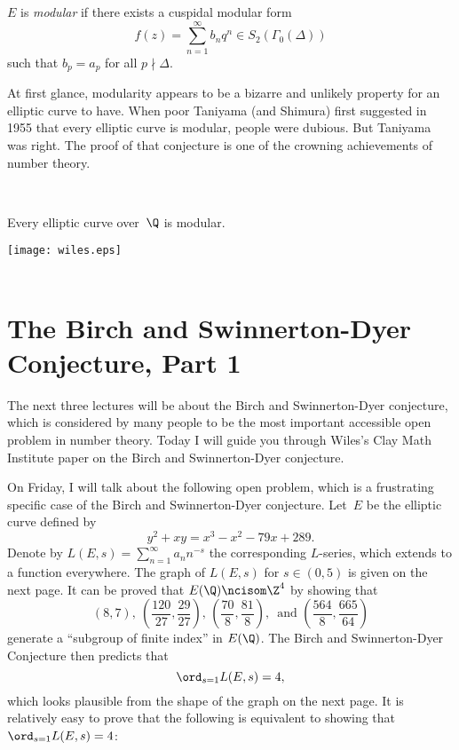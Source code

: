 \documentclass[11pt]{report}
\begin{document}
\begin{definition}[Modular]
  $E$ is {\em modular} if there
  exists a cuspidal modular form
  $$
    f(z) = \sum_{n=1}^{\infty} b_n q^n\in S_2(\Gamma_0(\Delta))
  $$
  such that
  $b_p = a_p$ for all $p\nmid \Delta$.
\end{definition}

At first glance, modularity appears to be a bizarre and unlikely
property for an elliptic curve to have.  When poor Taniyama (and
Shimura) first suggested in 1955 that every elliptic curve is modular,
people were dubious.  But Taniyama was right.  The proof of that conjecture
is one of the crowning achievements of number theory.

\begin{theorem}
  \mbox{}\vspace{-1.5em}\\
  \begin{center}
    {\sc Every elliptic curve over~$\Q$ is modular.}
  \end{center}

\end{theorem}

\vfill

\noindent{}\texttt{[image: wiles.eps]}\\
\mbox{ }\hspace{1.5em}{\small Wiles}








\chapter{The Birch and Swinnerton-Dyer Conjecture, Part 1}



The next three lectures will be about the
Birch and Swinnerton-Dyer conjecture, which is
considered by many people to be the most important
accessible open problem in number theory.  Today I
will guide you through Wiles's Clay Math Institute
paper on the Birch and Swinnerton-Dyer conjecture.

On Friday, I will talk about the following open problem, which is a
frustrating specific case of the Birch and Swinnerton-Dyer conjecture.
Let~$E$ be the elliptic curve defined by
$$
  y^2 + xy = x^3 - x^2 -79x + 289.
$$
Denote by
$L(E,s)=\sum_{n=1}^{\infty} a_n n^{-s}$
the corresponding $L$-series, which extends to a function
everywhere.  The graph of $L(E,s)$ for $s\in (0,5)$ is
given on the next page.
It can be proved that
$E(\Q) \ncisom \Z^4$
by showing that
$$
  (8,7),\ \left(\frac{120}{27},\frac{29}{27}\right),\,
  \left(\frac{70}{8},\frac{81}{8}\right),\,
  \text{ and }\left(\frac{564}{8}, \frac{665}{64}\right)
$$
generate a ``subgroup of finite index'' in $E(\Q)$.
The Birch and Swinnerton-Dyer Conjecture then predicts that
$$\ord_{s=1}L(E,s)=4,$$
which looks plausible from the shape of the graph on the next page.
It is relatively easy to prove that
the following is equivalent to showing that
$\ord_{s=1}L(E,s)=4$:
\end{document}
